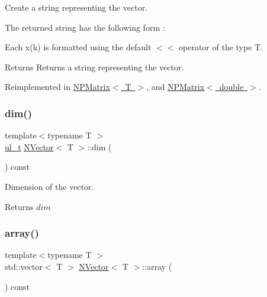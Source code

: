Create a string representing the vector. 

The returned string has the following form \+:


\begin{DoxyCode}{0}
\end{DoxyCode}
 Each {\ttfamily x(k)} is formatted using the default {\ttfamily $<$$<$} operator of the type {\ttfamily T}.

\begin{DoxyReturn}{Returns}
Returns a string representing the vector. 
\end{DoxyReturn}


Reimplemented in \mbox{\hyperlink{class_n_p_matrix_ac60d089a0a4b6d0a1df3cf549f50028d}{N\+P\+Matrix$<$ T $>$}}, and \mbox{\hyperlink{class_n_p_matrix_ac60d089a0a4b6d0a1df3cf549f50028d}{N\+P\+Matrix$<$ double $>$}}.

\mbox{\label{class_n_vector_a7589027db20509ac4d93490bb9a1979a}} 
\subsubsection{\texorpdfstring{dim()}{dim()}}
{\footnotesize\ttfamily template$<$typename T $>$ \\
\mbox{\hyperlink{group___n_algebra_ga1b140a2034db3f5dfe18a987745df43a}{ul\+\_\+t}} \mbox{\hyperlink{class_n_vector}{N\+Vector}}$<$ T $>$\+::dim (\begin{DoxyParamCaption}{ }\end{DoxyParamCaption}) const}



Dimension of the vector. 

\begin{DoxyReturn}{Returns}
$ dim $ 
\end{DoxyReturn}
\mbox{\label{class_n_vector_aa99d9fea7e30357df42f736013506fe1}} 
\subsubsection{\texorpdfstring{array()}{array()}}
{\footnotesize\ttfamily template$<$typename T $>$ \\
std\+::vector$<$ T $>$ \mbox{\hyperlink{class_n_vector}{N\+Vector}}$<$ T $>$\+::array (\begin{DoxyParamCaption}{ }\end{DoxyParamCaption}) const}



